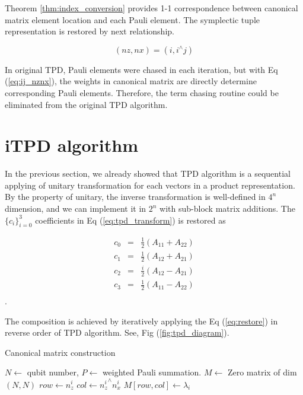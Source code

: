 \documentclass[twocolumn]{article}
\begin{document}
Theorem \ref{thm:index_conversion} provides 1-1 correspondence 
between canonical matrix element location and each Pauli element.
The symplectic tuple representation is restored by next relationship.

\begin{equation}
    (nz, nx) = (i, i^\wedge j)
\end{equation}

In original TPD, Pauli elements were chased in each iteration, 
but with Eq (\ref{eq:ij_nznx}), the weights in canonical matrix 
are directly determine corresponding Pauli elements.
Therefore, the term chasing routine could be eliminated from the original TPD algorithm.

\section{iTPD algorithm}

In the previous section, we already showed that TPD algorithm is a sequential 
applying of unitary transformation for each vectors in a product representation.
By the property of unitary, the inverse transformation is well-defined 
in $4^n$ dimension, and we can implement it in $2^n$ with 
sub-block matrix additions. 
The $\{c_i\}_{i=0}^3$ coefficients in Eq (\ref{eq:tpd_transform}) is restored as 

\begin{equation}
    \label{eq:restore}
    \begin{array}{ccc}
        c_0 &=& \frac{1}{2} (A_{11} + A_{22})\\
        c_1 &=& \frac{1}{2} (A_{12} + A_{21})\\
        c_2 &=& \frac{i}{2} (A_{12} - A_{21})\\
        c_3 &=& \frac{1}{2} (A_{11} - A_{22})\\
    \end{array}
\end{equation}.

The composition is achieved by iteratively applying the Eq (\ref{eq:restore}) in reverse order of TPD algorithm. 
See, Fig (\ref{fig:tpd_diagram}).

\begin{algorithm}
    \caption{Canonical matrix construction}\label{alg:ppoly_to_canonical}
    \begin{algorithmic}
        \Require $N \gets$ qubit number, $P \gets$ weighted Pauli summation.
        \State $M \gets$ Zero matrix of dim $(N,N)$
            \State $row \gets n_z^i$
            \State $col \gets {n_z^i}^\wedge n_x^i$
            \State $M[row, col] \gets \lambda_i$
        \EndFor
    \end{algorithmic}
\end{algorithm}
\end{document}
